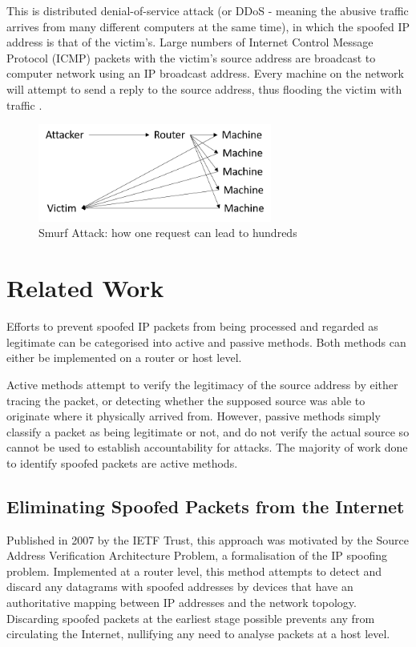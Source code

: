 \documentclass[twocolumn,10pt]{asme2ej}
\begin{document}
This is distributed denial-of-service attack (or DDoS - meaning the abusive traffic arrives from many different computers at the same time), in which the spoofed IP address is that of the victim's. Large numbers of Internet Control Message Protocol (ICMP) packets with the victim's source address are broadcast to computer network using an IP broadcast address\cite{rfc919}. Every machine on the network will attempt to send a reply to the source address, thus flooding the victim with traffic \cite{smurf}. 

\begin{figure}[h]
	\begin{center}
		\includegraphics[width=7.67cm, height=3.22cm]{figures/smurf}
	\end{center}
	\caption{Smurf Attack: how one request can lead to hundreds}
	\label{figure_smurf} 
\end{figure}

\section{Related Work} \label{defences}

Efforts to prevent spoofed IP packets from being processed and regarded as legitimate can be categorised into active and passive methods. Both methods can either be implemented on a router or host level. 

Active methods attempt to verify the legitimacy of the source address by either tracing the packet, or detecting whether the supposed source was able to originate where it physically arrived from. However, passive methods simply classify a packet as being legitimate or not, and do not verify the actual source so cannot be used to establish accountability for attacks. The majority of work done to identify spoofed packets are active methods.

\subsection{Eliminating Spoofed Packets from the Internet \cite{eliminating}}
Published in 2007 by the IETF Trust, this approach was motivated by the Source Address Verification Architecture Problem\cite{spoofProblemStatement}, a formalisation of the IP spoofing problem. Implemented at a router level, this method attempts to detect and discard any datagrams with spoofed addresses by devices that have an authoritative mapping between IP addresses and the network topology. Discarding spoofed packets at the earliest stage possible prevents any from circulating the Internet, nullifying any need to analyse packets at a host level.
\end{document}
